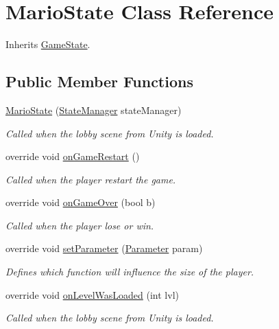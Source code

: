 \hypertarget{class_mario_state}{\section{Mario\-State Class Reference}
\label{class_mario_state}
}


Inherits \hyperlink{class_game_state}{Game\-State}.

\subsection*{Public Member Functions}
\begin{DoxyCompactItemize}
\item 
\hyperlink{class_mario_state_a7a11ee84dab9ee6b16657aaa7acb1f70}{Mario\-State} (\hyperlink{class_state_manager}{State\-Manager} state\-Manager)
\begin{DoxyCompactList}\small\item\em Called when the lobby scene from Unity is loaded.\end{DoxyCompactList}\item 
override void \hyperlink{class_mario_state_ada0965a69800c3203f0f2df27ab20b14}{on\-Game\-Restart} ()
\begin{DoxyCompactList}\small\item\em Called when the player restart the game.\end{DoxyCompactList}\item 
override void \hyperlink{class_mario_state_a2df561a80f05a8b25dbdda8ae9ec2e96}{on\-Game\-Over} (bool b)
\begin{DoxyCompactList}\small\item\em Called when the player lose or win.\end{DoxyCompactList}\item 
override void \hyperlink{class_mario_state_a279888e7b0863e82d5bff9a75aef04aa}{set\-Parameter} (\hyperlink{class_parameter}{Parameter} param)
\begin{DoxyCompactList}\small\item\em Defines which function will influence the size of the player.\end{DoxyCompactList}\item 
override void \hyperlink{class_mario_state_a9725076b267e50eec3262c8a0f471ffb}{on\-Level\-Was\-Loaded} (int lvl)
\begin{DoxyCompactList}\small\item\em Called when the lobby scene from Unity is loaded.\end{DoxyCompactList}\item 

\end{DoxyCompactItemize}

